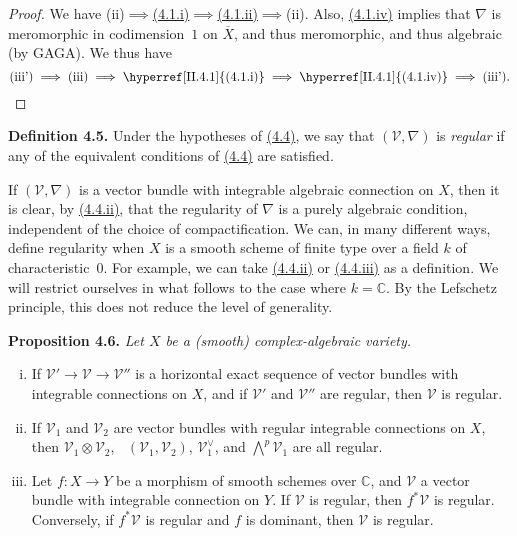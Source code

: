 \documentclass{report}
\newenvironment{itenv}[1]
  {\phantomsection\par\medskip\noindent\textbf{#1.}\itshape}
  {\medskip}
\newenvironment{rmenv}[1]
  {\phantomsection\par\medskip\noindent\textbf{#1.}\rmfamily}
  {\medskip}
\renewcommand{\cal}[1]{{\mathcal{#1}}}
\newcommand{\CC}{\mathbb{C}}
\DeclareMathOperator{\shHom}{\underline{Hom}}
\begin{document}
\begin{proof}
  We have \mbox{(ii)$\implies$\hyperref[II.4.1]{(4.1.i)}$\implies$\hyperref[II.4.1]{(4.1.ii)}$\implies$(ii)}.
  Also, \hyperref[II.4.1]{(4.1.iv)} implies that $\nabla$ is meromorphic in codimension~$1$ on $\overline{X}$, and thus meromorphic, and thus algebraic (by GAGA).
  We thus have
  \[
    \mbox{(iii')}
    \implies \mbox{(iii)}
    \implies \mbox{\hyperref[II.4.1]{(4.1.i)}}
    \implies \mbox{\hyperref[II.4.1]{(4.1.iv)}}
    \implies \mbox{(iii')}.
  \]
\end{proof}

\begin{rmenv}{Definition 4.5}
\label{II.4.5}
  Under the hypotheses of \hyperref[II.4.4]{(4.4)}, we say that $(\cal{V},\nabla)$ is \emph{regular} if any of the equivalent conditions of \hyperref[II.4.4]{(4.4)} are satisfied.
\end{rmenv}

If $(\cal{V},\nabla)$ is a vector bundle with integrable algebraic connection on $X$, then it is clear, by \hyperref[II.4.4]{(4.4.ii)}, that the regularity of $\nabla$ is a purely algebraic condition, independent of the choice of compactification.
We can, in many different ways, define regularity when $X$ is a smooth scheme of finite type over a field $k$ of characteristic~$0$.
For example, we can take \hyperref[II.4.4]{(4.4.ii)} or \hyperref[II.4.4]{(4.4.iii)} as a definition.
We will restrict ourselves in what follows to the case where $k=\CC$.
By the Lefschetz principle, this does not reduce the level of generality.

\begin{itenv}{Proposition 4.6}
\label{II.4.6}
  Let $X$ be a (smooth) complex-algebraic variety.
  \begin{enumerate}[(i)]
    \item If $\cal{V}'\to\cal{V}\to\cal{V}''$ is a horizontal exact sequence of vector bundles with integrable connections on $X$, and if $\cal{V}'$ and $\cal{V}''$ are regular, then $\cal{V}$ is regular.
    \item If $\cal{V}_1$ and $\cal{V}_2$ are vector bundles with regular integrable connections on $X$, then $\cal{V}_1\otimes\cal{V}_2$, $\shHom(\cal{V}_1,\cal{V}_2)$, $\cal{V}_1^\vee$, and $\bigwedge^p\cal{V}_1$ are all regular.
    \item Let $f\colon X\to Y$ be a morphism of smooth schemes over $\CC$, and $\cal{V}$ a vector bundle with integrable connection on $Y$.
      If $\cal{V}$ is regular, then $f^*\cal{V}$ is regular.
      Conversely, if $f^*\cal{V}$ is regular and $f$ is dominant, then $\cal{V}$ is regular.
  \end{enumerate}
\end{itenv}
\end{document}
